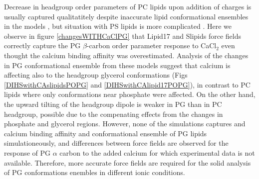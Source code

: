 \documentclass[aps,prl,superscriptaddress,twocolumn]{revtex4}
\begin{document}

Decrease in headgroup order parameters of PC lipids upon addition of charges is
usually captured qualitatitely despite inaccurate lipid conformational ensembles in the models \cite{catte16},
but situation with PS lipids is more complicated \cite{antila19,meclr20}.
Here we observe in figure \ref{changesWITHCaClPG} that
Lipid17 and Slipids force fields correctly capture the PG $\beta$-carbon order parameter response to CaCl$_2$
even thought the calcium binding affinity was overestimated.
Analysis of the changes in PG conformational ensemble from these models suggest that
calcium is affecting also to the headgroup glycerol conformations
(Figs \ref{DIHSwithCAslipidsPOPG} and \ref{DIHSwithCAlipid17POPG}),
in contrast to PC lipids where only conformations near phosphate were affected.
On the other hand, the upward tilting of the headgroup dipole is weaker
in PG than in PC headgroup, possible due to the compenating effects from the changes in
phosphate and glycerol regions. 
However, none of the simulations captures and calcium binding affinity and conformational ensemble of PG lipids
simulationeously, and differences between force fields are observed for the response of PG $\alpha$ carbon to
the added calcium for which experimental data is not available.
Therefore, more accurate force fields are required for the solid analysis of PG conformations enembles in different ionic conditions.
\end{document}
